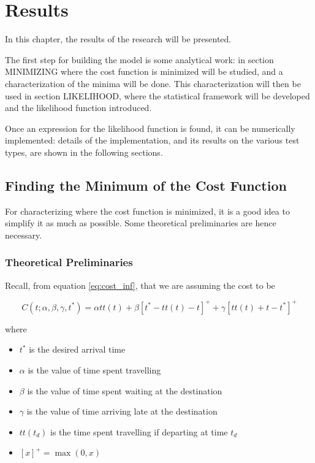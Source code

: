 \chapter{Results}
\label{chap:res}

In this chapter, the results of the research will be presented.

The first step for building the model is some analytical work:
in section MINIMIZING where the cost function is minimized will be studied,
and a characterization of the minima will be done.
This characterization will then be used in section LIKELIHOOD,
where the statistical framework will be developed and the likelihood function introduced.

Once an expression for the likelihood function is found,
it can be numerically implemented:
details of the implementation, and its results on the various test types,
are shown in the following sections.

\section{Finding the Minimum of the Cost Function}
\label{sec:minimum}

For characterizing where the cost function is minimized,
it is a good idea to simplify it as much as possible.
Some theoretical preliminaries are hence necessary.

\subsection{Theoretical Preliminaries}
\label{sec:pre_minimizing}

Recall, from equation \eqref{eq:cost_inf}, that we are assuming the cost to be

\begin{equation*}
  C(t; \alpha, \beta, \gamma, t^*) = \alpha tt(t) + \beta [t^* - tt(t) - t]^+ + \gamma[tt(t) + t - t^*]^+
\end{equation*}

where

\begin{itemize}
\item \(t^*\) is the desired arrival time
\item \(\alpha\) is the value of time spent travelling
\item \(\beta\) is the value of time spent waiting at the destination
\item \(\gamma\) is the value of time arriving late at the destination
\item \(tt(t_d)\) is the time spent travelling if departing at time \(t_d\)
\item \([x]^+ = \max(0, x)\)
\end{itemize}

